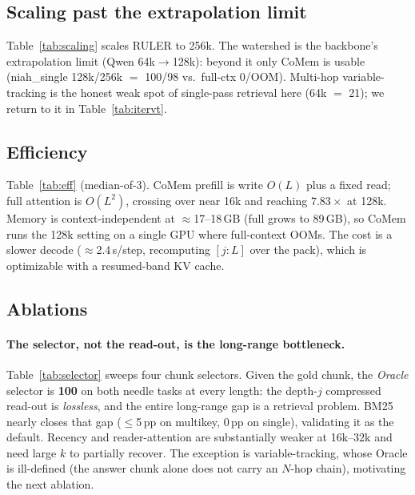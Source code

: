

\subsection{Scaling past the extrapolation limit}
Table~\ref{tab:scaling} scales RULER to 256k. The watershed is the backbone's
extrapolation limit (Qwen 64k$\to$128k): beyond it only CoMem is usable
(niah\_single 128k/256k $=$ 100/98 vs.\ full-ctx 0/OOM). Multi-hop
variable-tracking is the honest weak spot of single-pass retrieval here
(64k $=$ 21); we return to it in Table~\ref{tab:itervt}.



\subsection{Efficiency}
Table~\ref{tab:eff} (median-of-3). CoMem prefill is write $O(L)$ plus a fixed
read; full attention is $O(L^2)$, crossing over near 16k and reaching
$7.83\times$ at 128k. Memory is context-independent at $\approx$17--18\,GB
(full grows to 89\,GB), so CoMem runs the 128k setting on a single GPU where
full-context OOMs. The cost is a slower decode ($\approx$2.4\,s/step,
recomputing $[j{:}L]$ over the pack), which is optimizable with a resumed-band
KV cache.



\subsection{Ablations}
\paragraph{The selector, not the read-out, is the long-range bottleneck.}
Table~\ref{tab:selector} sweeps four chunk selectors. Given the gold chunk, the
\emph{Oracle} selector is \textbf{100} on both needle tasks at every length: the
depth-$j$ compressed read-out is \emph{lossless}, and the entire long-range gap
is a retrieval problem. BM25 nearly closes that gap ($\le$5\,pp on multikey,
0\,pp on single), validating it as the default. Recency and reader-attention are
substantially weaker at 16k--32k and need large $k$ to partially recover. The
exception is variable-tracking, whose Oracle is ill-defined (the answer chunk
alone does not carry an $N$-hop chain), motivating the next ablation.



